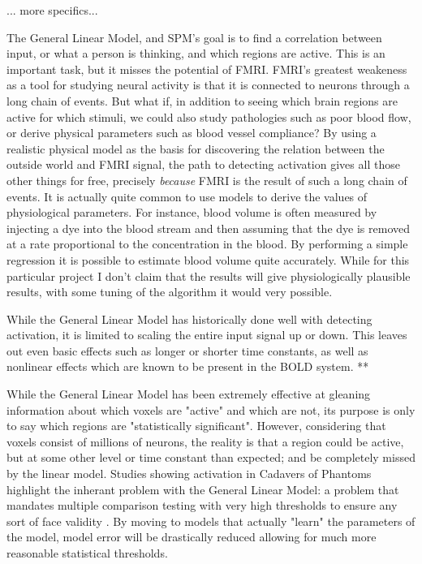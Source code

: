 \documentclass{article}
\begin{document}
... more specifics...

The General Linear Model, and 
SPM's goal is to find a correlation between input, or what a 
person is thinking, and which regions are active. This is an 
important task, but it misses the potential of FMRI. FMRI's 
greatest weakeness as a tool for studying neural activity is that
it is connected to neurons through a long chain of events. But
what if, in addition to seeing which brain regions are active
for which stimuli, we could also study pathologies such as poor
blood flow, or derive physical parameters such as blood vessel
compliance? By using a realistic physical model as the basis for
discovering the relation between the outside world and FMRI 
signal, the path to detecting activation gives all those other
things for free, precisely \emph{because} FMRI is the result of such
a long chain of events. It is actually quite common to use models to derive
the values of physiological parameters. For instance, blood volume
is often measured by injecting a dye into the blood stream and then
assuming that the dye is removed at a rate proportional to the
concentration in the blood. By performing a simple regression it is
possible to estimate blood volume quite accurately. While for
this particular project I don't claim that the results will give 
physiologically plausible results, with some tuning of the algorithm
it would very possible. 

While the General Linear Model has historically done well with
detecting activation, it is limited to scaling the entire input
signal up or down. This leaves out even basic effects such as 
longer or shorter time constants, as well as nonlinear effects which
are known to be present in the BOLD system. 
**


While the General Linear Model has been extremely effective at
gleaning information about which voxels are "active" and which
are not, its purpose is only to say which regions are "statistically
significant". However, considering that voxels consist of millions
of neurons, the reality is that a
region could be active, but at some other level or time constant
than expected; and be completely missed by the linear model. 
Studies showing activation
in Cadavers of Phantoms highlight the inherant problem with the 
General Linear Model: a problem that mandates multiple
comparison testing with very high thresholds to ensure any 
sort of face validity \cite{drift}.
By moving to models that actually "learn" the 
parameters of the model, model error will be drastically
reduced allowing for much more reasonable statistical thresholds.
\end{document}

